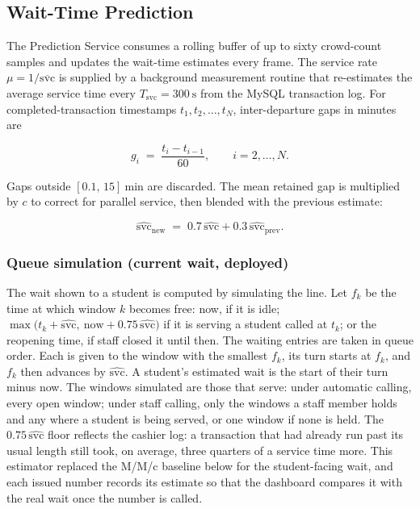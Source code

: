 \subsection{Wait-Time Prediction}
\label{subsec:prediction}

The Prediction Service consumes a rolling buffer of up to sixty
crowd-count samples and updates the wait-time estimates every frame.
The service rate $\mu = 1/\overline{\text{svc}}$ is supplied by a
background measurement routine that re-estimates the average service
time every $T_{\mathrm{svc}} = 300\ \mathrm{s}$ from the MySQL
transaction log. For completed-transaction timestamps
$t_1, t_2, \ldots, t_N$, inter-departure gaps in minutes are

\begin{equation}
g_i \;=\; \frac{t_i - t_{i-1}}{60}, \qquad i = 2, \ldots, N.
\label{eq:gap}
\end{equation}

\noindent Gaps outside $[0.1,\, 15]\ \mathrm{min}$ are discarded.
The mean retained gap is multiplied by $c$ to correct for parallel
service, then blended with the previous estimate:

\begin{equation}
\widehat{\mathrm{svc}}_{\text{new}} \;=\;
0.7\,\widehat{\mathrm{svc}} + 0.3\,\widehat{\mathrm{svc}}_{\text{prev}}.
\label{eq:svc-blend}
\end{equation}

\subsubsection{Queue simulation (current wait, deployed)}
\label{subsubsec:queue-engine}

The wait shown to a student is computed by simulating the line. Let
$f_k$ be the time at which window $k$ becomes free: now, if it is idle;
$\max\!\big(t_k + \widehat{\mathrm{svc}},\ \text{now} +
0.75\,\widehat{\mathrm{svc}}\big)$ if it is serving a student called at
$t_k$; or the reopening time, if staff closed it until then. The
waiting entries are taken in queue order. Each is given to the window
with the smallest $f_k$, its turn starts at $f_k$, and $f_k$ then
advances by $\widehat{\mathrm{svc}}$. A student's estimated wait is the
start of their turn minus now. The windows simulated are those that
serve: under automatic calling, every open window; under staff calling,
only the windows a staff member holds and any where a student is being
served, or one window if none is held. The $0.75\,\widehat{\mathrm{svc}}$ floor
reflects the cashier log: a transaction that had already run past its
usual length still took, on average, three quarters of a service time
more. This estimator replaced the M/M/c baseline below for the
student-facing wait, and each issued number records its estimate so
that the dashboard compares it with the real wait once the number is
called.

